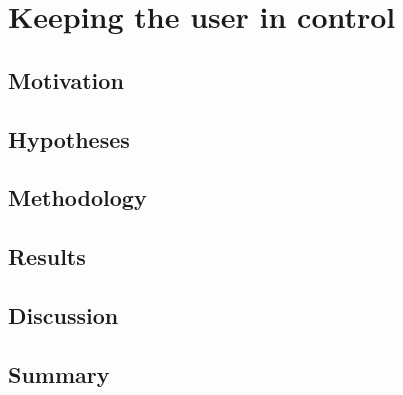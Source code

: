 \chapter{Keeping the user in control}\label{chap:control}

\section{Motivation}

\section{Hypotheses}

\section{Methodology}

\section{Results}

\section{Discussion}

\section{Summary}

